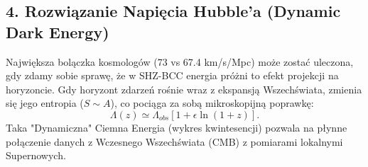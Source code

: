 \documentclass[11pt,a4paper]{article}
\begin{document}
\subsection*{4. Rozwiązanie Napięcia Hubble'a (Dynamic Dark Energy)}
Największa bolączka kosmologów (73 vs 67.4 km/s/Mpc) może zostać uleczona, gdy zdamy sobie sprawę, że w SHZ-BCC energia próżni to efekt projekcji na horyzoncie. Gdy horyzont zdarzeń rośnie wraz z ekspansją Wszechświata, zmienia się jego entropia ($S \sim A$), co pociąga za sobą mikroskopijną poprawkę:
\begin{equation}
    \Lambda(z) \simeq \Lambda_{obs} \left[ 1 + \epsilon \ln(1+z) \right].
\end{equation}
Taka "Dynamiczna" Ciemna Energia (wykres kwintesencji) pozwala na płynne połączenie danych z Wczesnego Wszechświata (CMB) z pomiarami lokalnymi Supernowych.
\end{document}
